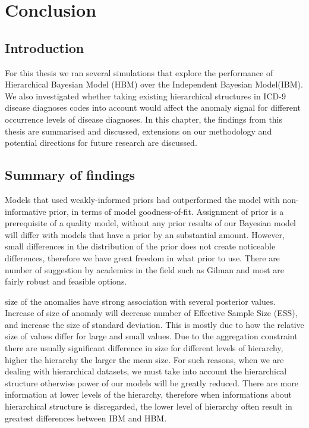 
\chapter{Conclusion} \label{chap:Conclusion1}

\section{Introduction}

For this thesis we ran several simulations that explore the performance of Hierarchical Bayesian Model (HBM) over the Independent Bayesian Model(IBM). We also investigated whether taking existing hierarchical structures in ICD-9 disease diagnoses codes into account would affect the anomaly signal for different occurrence levels of disease diagnoses. In this chapter, the findings from this thesis are summarised and discussed, extensions on our methodology and potential directions for future research are discussed.

\section{Summary of findings}

Models that used weakly-informed priors had outperformed the model with non-informative prior, in terms of model goodness-of-fit. Assignment of prior is a prerequisite of a quality model, without any prior results of our Bayesian model will differ with models that have a prior by an substantial amount. However, small differences in the distribution of the prior does not create noticeable differences, therefore we have great freedom in what prior to use. There are number of suggestion by academics in the field such as Gilman and most are fairly robust and feasible options. 

\newpara

size of the anomalies have strong association with several posterior values. Increase of size of anomaly will decrease number of Effective Sample Size (ESS), and increase the size of standard deviation. This is mostly due to how the relative size of values differ for large and small values. Due to the aggregation constraint there are usually significant difference in size for different levels of hierarchy, higher the hierarchy the larger the mean size. For such reasons, when we are dealing with hierarchical datasets, we must take into account the hierarchical structure otherwise power of our models will be greatly reduced. There are more information at lower levels of the hierarchy, therefore when informations about hierarchical structure is disregarded, the lower level of hierarchy often result in greatest differences between IBM and HBM.  

